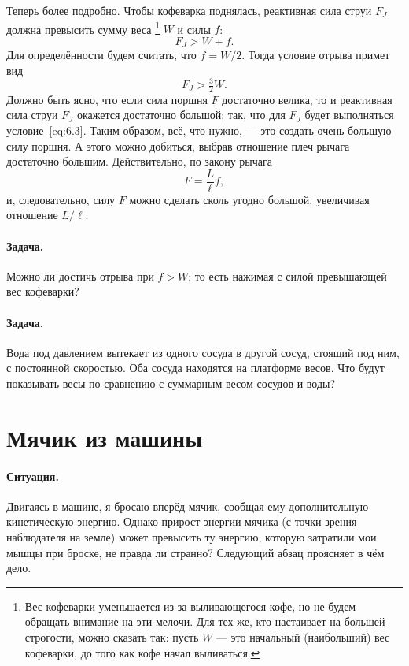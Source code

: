Теперь более подробно.
Чтобы кофеварка поднялась, реактивная сила струи $F_J$ должна превысить сумму веса%
\footnote{Вес кофеварки уменьшается из-за выливающегося кофе, но не будем обращать внимание на эти мелочи.
Для тех же, кто настаивает на большей строгости, можно сказать так: пусть $W$ — это начальный (наибольший) вес кофеварки, до того как кофе начал выливаться.}
$W$ и силы $f$:
\begin{equation}
F_J > W + f.
\label{eq:6.2}
\end{equation}
Для определённости будем считать, что $f = W/2$.
Тогда условие отрыва примет вид
\begin{equation}
F_J > \tfrac32W.
\label{eq:6.3}
\end{equation}
Должно быть ясно, что если сила поршня $F$ достаточно велика,
то и реактивная сила струи $F_J$ окажется достаточно большой;
так, что для $F_J$ будет выполняться условие~\eqref{eq:6.3}.
Таким образом, всё, что нужно, — это создать очень большую силу поршня.
А этого можно добиться, выбрав отношение плеч рычага достаточно большим.
Действительно, по закону рычага
\[
F = \frac{L}{\ell} f,
\]
и, следовательно, силу $F$ можно сделать сколь угодно большой,
увеличивая отношение $L/\ell$.

\paragraph{Задача.}
Можно ли достичь отрыва при $f > W$; то есть нажимая с силой превышающей вес кофеварки?

\paragraph{Задача.}
Вода под давлением вытекает из одного сосуда в другой сосуд, стоящий под ним, с постоянной скоростью.
Оба сосуда находятся на платформе весов.
Что будут показывать весы по сравнению с суммарным весом сосудов и воды?

\section{Мячик из машины}\label{Мячик из машины}

\paragraph{Ситуация.}
Двигаясь в машине, я бросаю вперёд мячик, сообщая ему дополнительную кинетическую энергию.
Однако прирост энергии мячика (с точки зрения наблюдателя на земле) может превысить ту энергию, которую затратили мои мышцы при броске, не правда ли странно?
Следующий абзац проясняет в чём дело.


